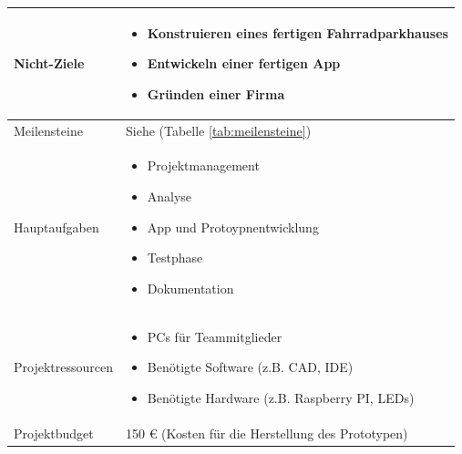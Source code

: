 \begin{longtable}{p{}|p{}}
  Nicht-Ziele                &
  \begin{itemize}
    \item Konstruieren eines fertigen Fahrradparkhauses
    \item Entwickeln einer fertigen App
    \item Gründen einer Firma
  \end{itemize}                                                                          \\  \midrule

  Meilensteine               & Siehe \nameref{tab:meilensteine} (Tabelle \ref{tab:meilensteine})                              \\ \midrule

  Hauptaufgaben              &
  \begin{itemize}
    \item Projektmanagement
    \item Analyse
    \item App und Protoypnentwicklung
    \item Testphase
    \item Dokumentation
  \end{itemize}                                                                                            \\  \midrule

  Projektressourcen          &
  \begin{itemize}
    \item PCs für Teammitglieder
    \item Benötigte Software (z.B. \ac{CAD}, \ac{IDE})
    \item Benötigte Hardware (z.B. Raspberry PI, LEDs)
  \end{itemize}                                                                           \\  \midrule

  Projektbudget              & 150 \euro{} (Kosten für die Herstellung des Prototypen)                                        \\ \midrule


\end{longtable}
